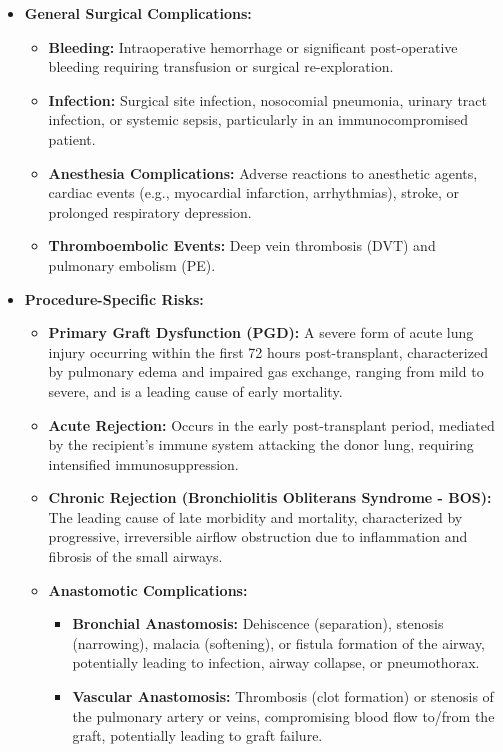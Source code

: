 \begin{itemize}
  \item \textbf{General Surgical Complications:}
    \begin{itemize}
      \item \textbf{Bleeding:} Intraoperative hemorrhage or significant post-operative bleeding requiring transfusion or surgical re-exploration.
      \item \textbf{Infection:} Surgical site infection, nosocomial pneumonia, urinary tract infection, or systemic sepsis, particularly in an immunocompromised patient.
      \item \textbf{Anesthesia Complications:} Adverse reactions to anesthetic agents, cardiac events (e.g., myocardial infarction, arrhythmias), stroke, or prolonged respiratory depression.
      \item \textbf{Thromboembolic Events:} Deep vein thrombosis (DVT) and pulmonary embolism (PE).
    \end{itemize}
  \item \textbf{Procedure-Specific Risks:}
    \begin{itemize}
      \item \textbf{Primary Graft Dysfunction (PGD):} A severe form of acute lung injury occurring within the first 72 hours post-transplant, characterized by pulmonary edema and impaired gas exchange, ranging from mild to severe, and is a leading cause of early mortality.
      \item \textbf{Acute Rejection:} Occurs in the early post-transplant period, mediated by the recipient's immune system attacking the donor lung, requiring intensified immunosuppression.
      \item \textbf{Chronic Rejection (Bronchiolitis Obliterans Syndrome - BOS):} The leading cause of late morbidity and mortality, characterized by progressive, irreversible airflow obstruction due to inflammation and fibrosis of the small airways.
      \item \textbf{Anastomotic Complications:}
        \begin{itemize}
          \item \textbf{Bronchial Anastomosis:} Dehiscence (separation), stenosis (narrowing), malacia (softening), or fistula formation of the airway, potentially leading to infection, airway collapse, or pneumothorax.
          \item \textbf{Vascular Anastomosis:} Thrombosis (clot formation) or stenosis of the pulmonary artery or veins, compromising blood flow to/from the graft, potentially leading to graft failure.

\end{itemize}
\end{itemize}
\end{itemize}
